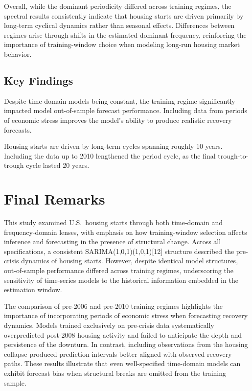 \documentclass[10pt,twocolumn,letterpaper]{article}
\begin{document}
Overall, while the dominant periodicity differed across training regimes, the spectral results consistently indicate that housing starts are driven primarily by long-term cyclical dynamics rather than seasonal effects. Differences between regimes arise through shifts in the estimated dominant frequency, reinforcing the importance of training-window choice when modeling long-run housing market behavior.


\subsection{Key Findings}
Despite time-domain models being constant, the training regime significantly impacted model out-of-sample forecast performance. Including data from periods of economic stress improves the model's ability to produce realistic recovery forecasts.

Housing starts are driven by long-term cycles spanning roughly 10 years. Including the data up to 2010 lengthened the period cycle, as the final trough-to-trough cycle lasted 20 years.


\section{Final Remarks}
\label{sec:final_remarks}

This study examined U.S.\ housing starts through both time-domain and frequency-domain lenses, with emphasis on how training-window selection affects inference and forecasting in the presence of structural change. Across all specifications, a consistent SARIMA(1,0,1)(1,0,1)[12] structure described the pre-crisis dynamics of housing starts. However, despite identical model structures, out-of-sample performance differed across training regimes, underscoring the sensitivity of time-series models to the historical information embedded in the estimation window.

The comparison of pre-2006 and pre-2010 training regimes highlights the importance of incorporating periods of economic stress when forecasting recovery dynamics. Models trained exclusively on pre-crisis data systematically overpredicted post-2008 housing activity and failed to anticipate the depth and persistence of the downturn. In contrast, including observations from the housing collapse produced prediction intervals better aligned with observed recovery paths. These results illustrate that even well-specified time-domain models can exhibit forecast bias when structural breaks are omitted from the training sample.
\end{document}
